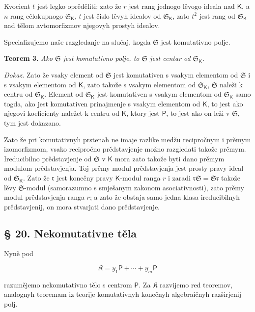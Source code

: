 \documentclass[11pt]{article}
\begin{document}
Kvocient \(t\) jest legko oprěděliti: zato že \(r\) jest rang jednogo lěvogo ideala nad \(\mathsf K\), a \(n\) rang cělokupnogo \(\mathfrak S_{\mathsf K}\), \(t\) jest čislo lěvyh idealov od \(\mathfrak S_{\mathsf K}\), zato \(t^2\) jest rang od \(\mathfrak S_{\mathsf K}\) nad tělom avtomorfizmov njegovyh prostyh idealov.

Specializujemo naše razgledanje na slučaj, kogda \(\mathfrak S\) jest komutativno polje.

\textbf{Teorem 3.} \emph{Ako \(\mathfrak S\) jest komutativno polje, to \(\mathfrak S\) jest centar od \(\mathfrak S_{\mathsf K}\).}

\emph{Dokaz.} Zato že vsaky element od \(\mathfrak S\) jest komutativen s vsakym elementom od \(\mathfrak S\) i s vsakym elementom od \(\mathsf K\), zato takože s vsakym elementom od \(\mathfrak S_{\mathsf K}\), \(\mathfrak S\) naleži k centru od \(\mathfrak S_{\mathsf K}\). Element od \(\mathfrak S_{\mathsf K}\) jest komutativen s vsakym elementom od \(\mathfrak S_{\mathsf K}\) samo togda, ako jest komutativen prinajmenje s vsakym elementom od \(\mathsf K\), to jest ako njegovi koeficienty naležet k centru od \(\mathsf K\), ktory jest \(\mathsf P\), to jest ako on leži v \(\mathfrak S\), tym jest dokazano.

Zato že pri komutativnyh prstenah ne imaje razlike medžu recipročnym i prěmym izomorfizmom, vsako recipročno prědstavjenje možno razgledati takože prěmym. Ireducibilno prědstavjenje od \(\mathfrak S\) v \(\mathsf K\) mora zato takože byti dano prěmym modulom prědstavjenja. Toj prěmy modul prědstavjenja jest prosty pravy ideal od \(\mathfrak S_{\mathsf K}\). Zato že \(\mathfrak r\) jest konečny pravy \(\mathsf K\)-modul ranga \(r\) i zaradi \(\mathfrak r\mathfrak S=\mathfrak S\mathfrak r\) takože lěvy \(\mathfrak S\)-modul (samorazumno s smješanym zakonom asociativnosti), zato prěmy modul prědstavjenja ranga \(r\); a zato že obstaja samo jedna klasa ireducibilnyh prědstavjenij, on mora stvarjati dano prědstavjenje.

\subsection*{§ 20. Nekomutativne těla}\label{nichtkommutative-koerper}

Nyně pod

\[
\mathfrak K=y_1\mathsf P+\cdots+y_m\mathsf P
\]

razumějemo nekomutativno tělo s centrom \(\mathsf P\). Za \(\mathfrak K\) razvijemo red teoremov, analognyh teoremam iz teorije komutativnyh konečnyh algebraičnyh razširjenij polj.
\end{document}
